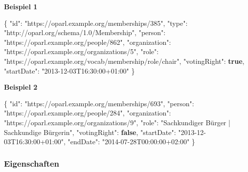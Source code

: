 \documentclass[,a4paper]{article}
\newenvironment{Shaded}{}{}
\newcommand{\KeywordTok}[1]{\textcolor[rgb]{0.00,0.44,0.13}{\textbf{{#1}}}}
\newcommand{\DataTypeTok}[1]{\textcolor[rgb]{0.56,0.13,0.00}{{#1}}}
\newcommand{\StringTok}[1]{\textcolor[rgb]{0.25,0.44,0.63}{{#1}}}
\newcommand{\FunctionTok}[1]{\textcolor[rgb]{0.02,0.16,0.49}{{#1}}}
\begin{document}
\textbf{Beispiel 1}

\begin{Shaded}
\begin{Highlighting}[]
\FunctionTok{\{}
    \DataTypeTok{"id"}\FunctionTok{:} \StringTok{"https://oparl.example.org/memberships/385"}\FunctionTok{,}
    \DataTypeTok{"type"}\FunctionTok{:} \StringTok{"http://oparl.org/schema/1.0/Membership"}\FunctionTok{,}
    \DataTypeTok{"person"}\FunctionTok{:} \StringTok{"https://oparl.example.org/people/862"}\FunctionTok{,}
    \DataTypeTok{"organization"}\FunctionTok{:} \StringTok{"https://oparl.example.org/organizations/5"}\FunctionTok{,}
    \DataTypeTok{"role"}\FunctionTok{:} \StringTok{"https://oparl.example.org/vocab/membership/role/chair"}\FunctionTok{,}
    \DataTypeTok{"votingRight"}\FunctionTok{:} \KeywordTok{true}\FunctionTok{,}
    \DataTypeTok{"startDate"}\FunctionTok{:} \StringTok{"2013-12-03T16:30:00+01:00"}
\FunctionTok{\}}
\end{Highlighting}
\end{Shaded}

\textbf{Beispiel 2}

\begin{Shaded}
\begin{Highlighting}[]
\FunctionTok{\{}
    \DataTypeTok{"id"}\FunctionTok{:} \StringTok{"https://oparl.example.org/memberships/693"}\FunctionTok{,}
    \DataTypeTok{"person"}\FunctionTok{:} \StringTok{"https://oparl.example.org/people/284"}\FunctionTok{,}
    \DataTypeTok{"organization"}\FunctionTok{:} \StringTok{"https://oparl.example.org/organizations/9"}\FunctionTok{,}
    \DataTypeTok{"role"}\FunctionTok{:} \StringTok{"Sachkundiger Bürger | Sachkundige Bürgerin"}\FunctionTok{,}
    \DataTypeTok{"votingRight"}\FunctionTok{:} \KeywordTok{false}\FunctionTok{,}
    \DataTypeTok{"startDate"}\FunctionTok{:} \StringTok{"2013-12-03T16:30:00+01:00"}\FunctionTok{,}
    \DataTypeTok{"endDate"}\FunctionTok{:} \StringTok{"2014-07-28T00:00:00+02:00"}
\FunctionTok{\}}
\end{Highlighting}
\end{Shaded}

\subsubsection{Eigenschaften}\label{eigenschaften-10}
\end{document}
